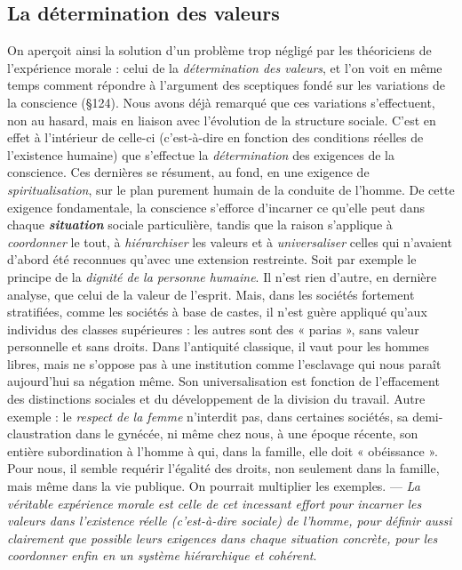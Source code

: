 \subsection{La détermination des valeurs}%
On aperçoit ainsi la solution
d’un problème trop négligé par les théoriciens de l’expérience
morale : celui de la {\it détermination des valeurs}, et l’on voit en même
temps comment répondre à l’argument des sceptiques fondé sur les
variations de la conscience (\S 124). Nous avons déjà remarqué que
ces variations s’effectuent, non au hasard, mais en liaison avec l’évolution
de la structure sociale. C’est en effet à l’intérieur de celle-ci
(c’est-à-dire en fonction des conditions réelles de l’existence humaine)
que s’effectue la {\it détermination} des exigences de la conscience. Ces
dernières se résument, au fond, en une exigence de {\it spiritualisation},
sur le plan purement humain de la conduite de l’homme. De cette
exigence fondamentale, la conscience s’efforce d’incarner ce qu’elle
peut dans chaque \textbf{\textit {situation}} sociale particulière, tandis que la raison
s'applique à {\it coordonner} le tout, à {\it hiérarchiser} les valeurs et à
{\it universaliser}
celles qui n’avaient d’abord été reconnues qu'avec une extension
restreinte. Soit par exemple le principe de la {\it dignité de la personne
humaine}. Il n’est rien d’autre, en dernière analyse, que celui
de la valeur de l’esprit. Mais, dans les sociétés fortement stratifiées,
comme les sociétés à base de castes, il n’est guère appliqué qu’aux
individus des classes supérieures : les autres sont des « parias », sans
valeur personnelle et sans droits. Dans l’antiquité classique, il vaut
pour les hommes libres, mais ne s’oppose pas à une institution comme
l’esclavage qui nous paraît aujourd’hui sa négation même. Son universalisation
est fonction de l'effacement des distinctions sociales et
du développement de la division du travail. Autre exemple : le {\it respect
de la femme} n’interdit pas, dans certaines sociétés, sa demi-claustration
dans le gynécée, ni même chez nous, à une époque récente, son
entière subordination à l’homme à qui, dans la famille, elle doit
« obéissance ». Pour nous, il semble requérir l’égalité des droits, non
seulement dans la famille, mais même dans la vie publique. On pourrait
multiplier les exemples. — {\it La véritable expérience morale est celle
de cet incessant effort pour incarner les valeurs dans l'existence réelle
(c'est-à-dire sociale) de l’homme, pour définir aussi clairement que
possible leurs exigences dans chaque situation concrète, pour les coordonner
enfin en un système hiérarchique et cohérent}.

